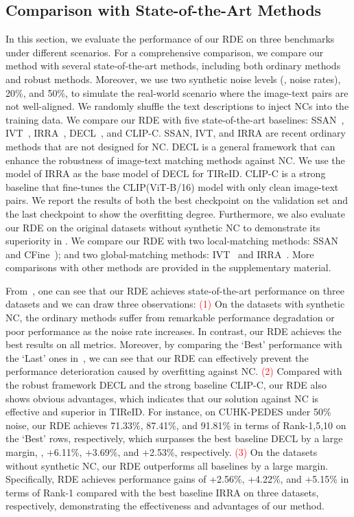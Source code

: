 \documentclass[10pt,twocolumn,letterpaper]{article}
\begin{document}
\subsection{Comparison with State-of-the-Art Methods}
In this section, we evaluate the performance of our RDE on three benchmarks under different scenarios. For a comprehensive comparison, we compare our method with several state-of-the-art methods, including both ordinary methods and robust methods. Moreover, we use two synthetic noise levels (\ie, noise rates), 20\%, and 50\%, to simulate the real-world scenario where the image-text pairs are not well-aligned. We randomly shuffle the text descriptions to inject NCs into the training data. We compare our RDE with five state-of-the-art baselines:  SSAN~\cite{ding2021semantically}, IVT~\cite{shu2022see}, IRRA~\cite{jiang2023cross}, DECL~\cite{qin2022deep}, and CLIP-C. SSAN, IVT, and IRRA are recent ordinary methods that are not designed for NC. DECL is a general framework that can enhance the robustness of image-text matching methods against NC. We use the model of IRRA as the base model of DECL for TIReID. CLIP-C is a strong baseline that fine-tunes the CLIP(ViT-B/16) model with only clean image-text pairs. We report the results of both the best checkpoint on the validation set and the last checkpoint to show the overfitting degree. Furthermore, we also evaluate our RDE on the original datasets without synthetic NC to demonstrate its superiority in . We compare our RDE with two local-matching methods: SSAN~\cite{ding2021semantically} and CFine~\cite{yan2022clip}); and two global-matching methods: IVT~\cite{shu2022see} and IRRA~\cite{jiang2023cross}. More comparisons with other methods are provided in the supplementary material.

From~, one can see that our RDE  achieves state-of-the-art performance on three datasets and we can draw three observations: \textcolor{red}{{(1)}} On the datasets with synthetic NC, the ordinary methods suffer from remarkable performance degradation or poor performance as the noise rate increases. In contrast, our RDE achieves the best results on all metrics. Moreover, by comparing the `Best' performance with the `Last' ones in~, we can see that our RDE can effectively prevent the performance deterioration caused by overfitting against NC. \textcolor{red}{{(2)}} Compared with the robust framework DECL and the strong baseline CLIP-C, our RDE also shows obvious advantages, which indicates that our solution against NC is effective and superior in TIReID. For instance, on CUHK-PEDES under 50\% noise, our RDE achieves 71.33\%, 87.41\%, and 91.81\% in terms of Rank-1,5,10 on the `Best' rows, respectively, which surpasses the best baseline DECL by a large margin, \ie, +6.11\%, +3.69\%, and +2.53\%, respectively. \textcolor{red}{{(3)}} On the datasets without synthetic NC, our RDE outperforms all baselines by a large margin. Specifically, RDE achieves performance gains of +2.56\%, +4.22\%, and +5.15\% in terms of Rank-1 compared with the best baseline IRRA on three datasets, respectively, demonstrating the effectiveness and advantages of our method. 
\end{document}

